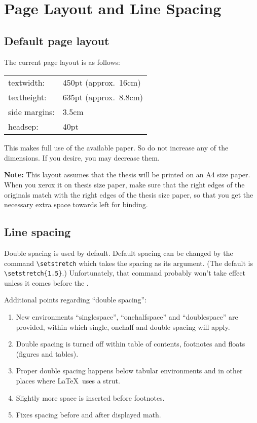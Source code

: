\chapter{Page Layout and Line Spacing}

\section{Default page layout}
The current page layout is as follows:

\bigskip
\begin{center}
\begin{tabular}{|ll|}
	\hline
	textwidth:& 450pt (approx.\ 16cm) \\
        textheight:& 635pt (approx.\ 8.8cm) \\
        side margins:& 3.5cm \\
	headsep:& 40pt\\
	\hline
\end{tabular}
\end{center}

\bigskip
This makes full use of the available paper. So do not increase any of
the dimensions. If you desire, you may decrease them. 

	{\bf Note:} This   layout  assumes  that the  thesis  will  be
printed on  an A4  size paper.  When you xerox it on thesis size
paper, make sure that the right edges of the originals  match with the
right  edges of  the  thesis  size  paper, so   that you  get the
necessary extra space towards left for binding.

\section{Line spacing}
	Double  spacing   is  used  by   default.
Default spacing can be changed by the command \verb|\setstretch| which
takes    the     spacing   as    its   argument.   (The    default  is
\verb|\setstretch{1.5}|.)  Unfortunately, that command probably  won't
take effect  unless it  comes  before  the \verb||.

Additional points regarding ``double spacing'':
\begin{enumerate}
 \item New   environments   ``singlespace'',   ``onehalfspace''    and
``doublespace'' are provided, within which single, onehalf and double
    spacing will apply.
	 \item Double spacing is turned off within  table of contents,
		footnotes and floats (figures and tables).
	 \item Proper double spacing happens below tabular environments and in other
	    places where \LaTeX\ uses a strut.
	 \item Slightly more space is inserted before footnotes.
	 \item Fixes spacing before and after displayed math.
\end{enumerate}

